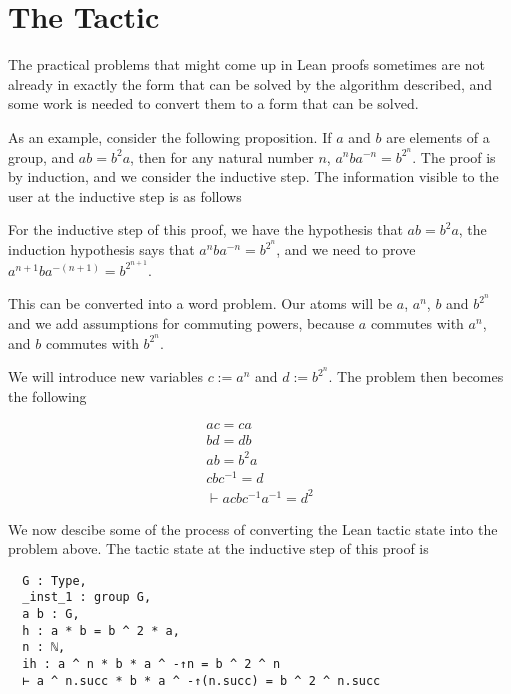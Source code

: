 \documentclass[11pt]{article} %
\theoremstyle{definition}
\theoremstyle{definition}
\theoremstyle{definition}
\theoremstyle{definition}
\theoremstyle{definition}
\theoremstyle{definition}
\begin{document}
\section{The Tactic}

The practical problems that might come up in Lean proofs sometimes are not already in
exactly the form that can be solved by the algorithm described, and some work
is needed to convert them to a form that can be solved.

As an example, consider the following proposition. If $a$ and $b$ are elements
of a group, and $ab = b^2a$, then for any natural number $n$, $a^nba^{-n} = b^{2^n}$.
The proof is by induction, and we consider the inductive step. The information
visible to the user at the inductive step is as follows

For the inductive step of this proof, we have the hypothesis that $ab = b^2a$,
the induction hypothesis says that $a^nba^{-n} = b^{2^n}$,
and we need to prove $a^{n+1}ba^{-(n+1)} = b^{2^{n+1}}$.

This can be converted into a word problem. Our atoms will be
$a$, $a^n$, $b$ and $b^{2^n}$ and we add assumptions for commuting powers,
because $a$ commutes with $a^n$, and $b$ commutes with $b^{2^n}$.

We will introduce new variables $c := a^n$ and $d := b^{2^n}$. The problem
then becomes the following

\begin{equation}
  \begin{aligned}
    ac=ca \\
    bd=db \\
    ab=b^2a \\
    cbc^{-1} = d \\
    \vdash acbc^{-1}a^{-1} = d^2
  \end{aligned}
\end{equation}

We now descibe some of the process of converting the Lean tactic state into the
problem above. The tactic state at the inductive step of this proof is

\begin{lstlisting}
  G : Type,
  _inst_1 : group G,
  a b : G,
  h : a * b = b ^ 2 * a,
  n : ℕ,
  ih : a ^ n * b * a ^ -↑n = b ^ 2 ^ n
  ⊢ a ^ n.succ * b * a ^ -↑(n.succ) = b ^ 2 ^ n.succ
\end{lstlisting}
\end{document}
